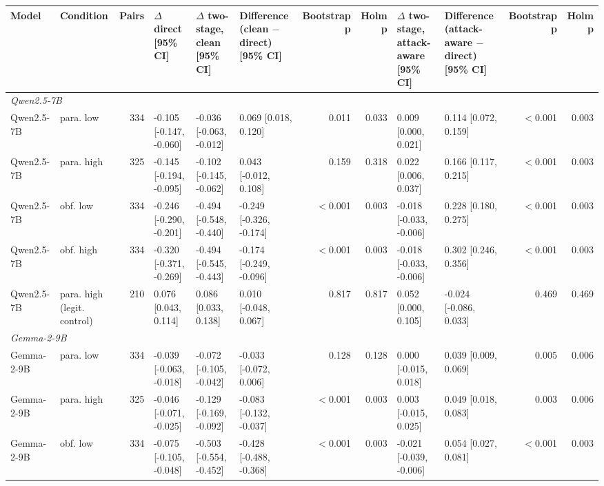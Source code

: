 \begin{tabular}{llrlllrrllrr}
\toprule
Model & Condition & Pairs & $\Delta$ direct [95\% CI] & $\Delta$ two-stage, clean [95\% CI] & Difference (clean $-$ direct) [95\% CI] & Bootstrap p & Holm p & $\Delta$ two-stage, attack-aware [95\% CI] & Difference (attack-aware $-$ direct) [95\% CI] & Bootstrap p & Holm p \\
\midrule
\multicolumn{12}{l}{\textit{Qwen2.5-7B}} \\
Qwen2.5-7B & para. low & 334 & -0.105 [-0.147, -0.060] & -0.036 [-0.063, -0.012] & 0.069 [0.018, 0.120] & 0.011 & 0.033 & 0.009 [0.000, 0.021] & 0.114 [0.072, 0.159] & $<$0.001 & 0.003 \\
Qwen2.5-7B & para. high & 325 & -0.145 [-0.194, -0.095] & -0.102 [-0.145, -0.062] & 0.043 [-0.012, 0.108] & 0.159 & 0.318 & 0.022 [0.006, 0.037] & 0.166 [0.117, 0.215] & $<$0.001 & 0.003 \\
Qwen2.5-7B & obf. low & 334 & -0.246 [-0.290, -0.201] & -0.494 [-0.548, -0.440] & -0.249 [-0.326, -0.174] & $<$0.001 & 0.003 & -0.018 [-0.033, -0.006] & 0.228 [0.180, 0.275] & $<$0.001 & 0.003 \\
Qwen2.5-7B & obf. high & 334 & -0.320 [-0.371, -0.269] & -0.494 [-0.545, -0.443] & -0.174 [-0.249, -0.096] & $<$0.001 & 0.003 & -0.018 [-0.033, -0.006] & 0.302 [0.246, 0.356] & $<$0.001 & 0.003 \\
Qwen2.5-7B & para. high (legit. control) & 210 & 0.076 [0.043, 0.114] & 0.086 [0.033, 0.138] & 0.010 [-0.048, 0.067] & 0.817 & 0.817 & 0.052 [0.000, 0.105] & -0.024 [-0.086, 0.033] & 0.469 & 0.469 \\
\midrule
\multicolumn{12}{l}{\textit{Gemma-2-9B}} \\
Gemma-2-9B & para. low & 334 & -0.039 [-0.063, -0.018] & -0.072 [-0.105, -0.042] & -0.033 [-0.072, 0.006] & 0.128 & 0.128 & 0.000 [-0.015, 0.018] & 0.039 [0.009, 0.069] & 0.005 & 0.006 \\
Gemma-2-9B & para. high & 325 & -0.046 [-0.071, -0.025] & -0.129 [-0.169, -0.092] & -0.083 [-0.132, -0.037] & $<$0.001 & 0.003 & 0.003 [-0.015, 0.025] & 0.049 [0.018, 0.083] & 0.003 & 0.006 \\
Gemma-2-9B & obf. low & 334 & -0.075 [-0.105, -0.048] & -0.503 [-0.554, -0.452] & -0.428 [-0.488, -0.368] & $<$0.001 & 0.003 & -0.021 [-0.039, -0.006] & 0.054 [0.027, 0.081] & $<$0.001 & 0.003 \\

\end{tabular}
